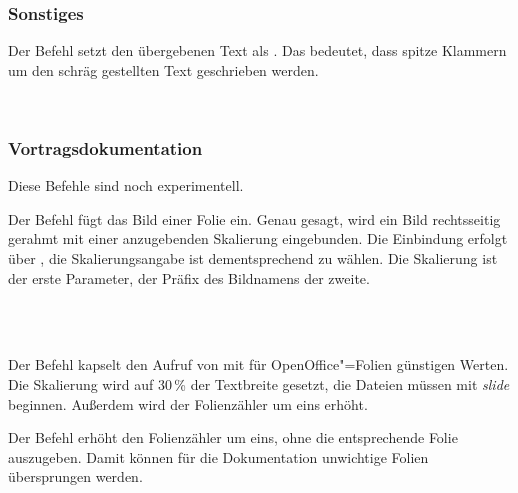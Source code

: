 \subsubsection{Sonstiges}

\DescribeMacro{\meta}
Der Befehl  setzt den übergebenen Text als .
Das bedeutet, dass spitze Klammern um den schräg gestellten Text geschrieben werden.
\begin{nutzung}
		\>\\
	\beispiel
		\>
\end{nutzung}

\subsubsection{Vortragsdokumentation}

Diese Befehle sind noch experimentell.

\DescribeMacro{\insertslide}
Der Befehl  fügt das Bild einer Folie ein.
Genau gesagt, wird ein Bild rechtsseitig gerahmt mit einer anzugebenden Skalierung eingebunden.
Die Einbindung erfolgt über , die Skalierungsangabe ist dementsprechend zu wählen.
Die Skalierung ist der erste Parameter, der Präfix des Bildnamens der zweite.

\begin{nutzung}
		\>\\
	\beispiel
		\>\\
		\>
\end{nutzung}

\DescribeMacro{\nextslide}
Der Befehl  kapselt den Aufruf von  mit für OpenOffice"=Folien günstigen Werten.
Die Skalierung wird auf 30\,\% der Textbreite gesetzt, die Dateien müssen mit \emph{slide} beginnen.
Außerdem wird der Folienzähler um eins erhöht.

\begin{nutzung}
		\>
\end{nutzung}

\DescribeMacro{\nextslidesilent}
Der Befehl  erhöht den Folienzähler um eins, ohne die entsprechende Folie auszugeben.
Damit können \zB für die Dokumentation unwichtige Folien übersprungen werden.

\begin{nutzung}
		\>
\end{nutzung}


